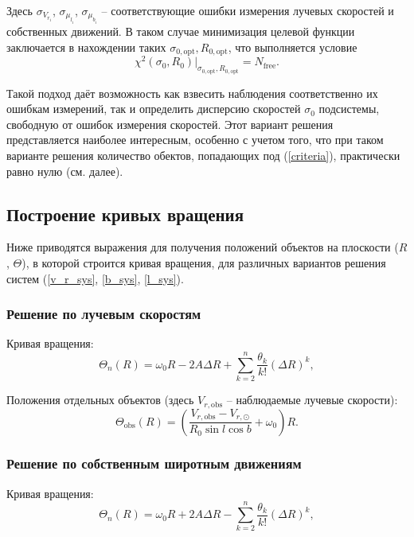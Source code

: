 \documentclass{matmex-diploma-custom}
\begin{document}
\par Здесь $\sigma_{V_{r_i}}$, $\sigma_{\mu_{l_i}}$, $\sigma_{\mu_{b_i}}$ -- соответствующие ошибки измерения лучевых скоростей и собственных движений.
В таком случае минимизация целевой функции заключается в нахождении таких $\sigma_{0, \mathrm{opt}}, R_{0, \mathrm{opt}}$, что выполняется условие
\begin{equation}
        \chi^2(\sigma_0, R_0) |_{\sigma_{0, \mathrm{opt}}, R_{0, \mathrm{opt}}} = N_{\mathrm{free}}.
\end{equation}

\par Такой подход даёт возможность как взвесить наблюдения соответственно их ошибкам измерений, так и определить дисперсию скоростей $\sigma_0$ подсистемы, свободную от ошибок измерения скоростей. Этот вариант решения представляется наиболее интересным, особенно с учетом того, что при таком варианте решения количество обектов, попадающих под (\ref{criteria}), практически равно нулю (см. далее).

\subsection{Построение кривых вращения}
Ниже приводятся выражения для получения положений объектов на плоскости ($R$, $\Theta$), в которой строится кривая вращения, для различных вариантов решения систем (\ref{v_r_sys}, \ref{b_sys}, \ref{l_sys}).
\subsubsection{Решение по лучевым скоростям}
Кривая вращения:
\begin{equation} \label{curve_mod_vr}
        \Theta_n(R) = \omega_0 R - 2A\Delta R + \sum^n_{k = 2} \frac{\theta_k}{k!} \left( \Delta R \right)^k ,
\end{equation}

Положения отдельных объектов (здесь $V_{r, \mathrm{obs}}$ -- наблюдаемые лучевые скорости):
\begin{equation}
        \Theta_{\mathrm{obs}}(R) = \left( \frac{V_{r, \mathrm{obs}} - V_{r, \odot}}{R_0 \sin{l} \cos{b}} + \omega_0 \right) R.
\end{equation}
\subsubsection{Решение по собственным широтным движениям}
Кривая вращения:
\begin{equation}
        \Theta_n(R) = \omega_0 R + 2A\Delta R - \sum^n_{k = 2} \frac{\theta_k}{k!} \left( \Delta R \right)^k ,
\end{equation}
\end{document}

